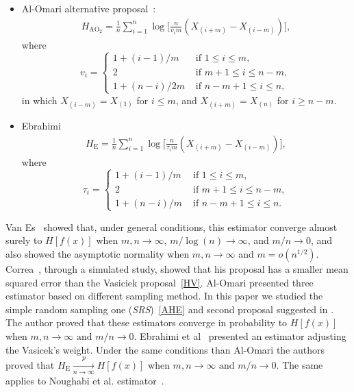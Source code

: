 \documentclass[journal]{IEEEtran}
\begin{document}
\begin{itemize}
	\item Al-Omari alternative proposal~\cite{AlOmari2016}:
	\label{AO2}
	\begin{align}
		H_{{\text{AO}}_2}=\frac{1}{n} \sum_{i=1}^{n} \log \Big[\frac{n}{v_{i} m}\left(X_{(i+m)}-X_{(i-m)}\right)\Big],
	\end{align}
	where
	\begin{equation*}
		v_{i}=\begin{cases}
			1+(i-1)/m & \text{ if }1 \leq i \leq m, \\
			2 & \text{ if } m+1 \leq i \leq n-m, \\
			1+(n-i)/2m & \text{ if } n-m+1 \leq i \leq n,
		\end{cases}
	\end{equation*}
	in which $X_{(i-m)}=X_{(1)}$ for $i \leq m$, and $X_{(i+m)}=X_{(n)}$ for $i \geq n-m$.
	\item Ebrahimi~\cite{Ebrahimi94}
	\begin{align}
		H_\text{E}=\frac{1}{n} \sum_{i=1}^{n} \log \Big[\frac{n}{\tau_{i} m}\left(X_{(i+m)}-X_{(i-m)}\right)\Big],
		\label{HE}
	\end{align}
	where
	\begin{equation*}
		\tau_{i}=\begin{cases}
			1+(i-1)/m & \text{ if }1 \leq i \leq m, \\
			2 & \text{ if } m+1 \leq i \leq n-m, \\
			1+(n-i)/m & \text{ if } n-m+1 \leq i \leq n.
		\end{cases}
	\end{equation*}
\end{itemize}

Van Es~\cite{VanEs92} showed that, under general conditions, this estimator converge almost surely to $H[f(x)]$ when $m, n \to \infty$, $m/\log(n) \to \infty$, and $m/n \to 0$, and also showed the asymptotic normality when $m, n \to \infty$ and $m = o(n^{1/2})$. 
Correa~\cite{Correa95}, through a simulated study, showed that his proposal has a smaller mean squared error than the Vasiciek proposal~\eqref{HV}. Al-Omari\cite{AlOmari2014} presented three estimator based on different sampling method. In this paper we studied the simple random sampling one (\textit{SRS})~\eqref{AHE} and second proposal suggested
in \cite{AlOmari2016}. The author proved that these estimators converge in probability to $ H[f(x)]$ when $m, n \to \infty  \text{ and } m/n \to 0$. Ebrahimi et al~\cite{Ebrahimi94} presented an estimator adjusting the Vasicek's\cite{Vasicek76} weight. Under the same conditions than Al-Omari\cite{AlOmari2014} the authors proved that $H_{\text{E}}\underset{n \to \infty}{\overset{p}{\longrightarrow}} H[f(x)]$ when $m, n \to \infty  \text{ and } m/n \to 0$. The same applies to Noughabi et al. estimator~\cite{Noughabi2010}.
\end{document}

